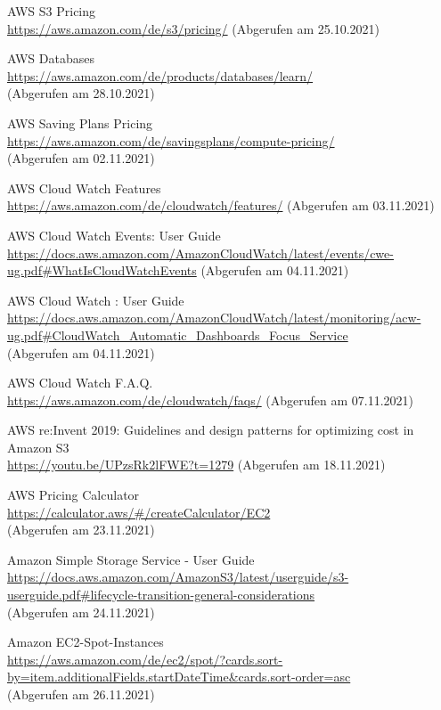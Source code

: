 \begin{thebibliography}{HR08}
   AWS S3 Pricing\\
  \url{https://aws.amazon.com/de/s3/pricing/}
  (Abgerufen am 25.10.2021)

   AWS Databases\\
  \url{https://aws.amazon.com/de/products/databases/learn/}\\
  (Abgerufen am 28.10.2021)

   AWS Saving Plans Pricing\\
  \url{https://aws.amazon.com/de/savingsplans/compute-pricing/}\\
  (Abgerufen am 02.11.2021)

   AWS Cloud Watch Features\\
  \url{https://aws.amazon.com/de/cloudwatch/features/}
  (Abgerufen am 03.11.2021)


   AWS Cloud Watch Events: User Guide\\
  \url{https://docs.aws.amazon.com/AmazonCloudWatch/latest/events/cwe-ug.pdf#WhatIsCloudWatchEvents}
  (Abgerufen am 04.11.2021)

 AWS Cloud Watch : User Guide\\
  \url{https://docs.aws.amazon.com/AmazonCloudWatch/latest/monitoring/acw-ug.pdf#CloudWatch_Automatic_Dashboards_Focus_Service}
  \\(Abgerufen am 04.11.2021)

 AWS Cloud Watch F.A.Q.\\
  \url{https://aws.amazon.com/de/cloudwatch/faqs/}
  (Abgerufen am 07.11.2021)

 AWS re:Invent 2019: Guidelines and design patterns for optimizing cost in Amazon S3\\
  \url{https://youtu.be/UPzsRk2lFWE?t=1279}
  (Abgerufen am 18.11.2021)

 AWS Pricing Calculator\\
  \url{https://calculator.aws/#/createCalculator/EC2}\\
  (Abgerufen am 23.11.2021)
  
 Amazon Simple Storage Service - User Guide\\
  \url{https://docs.aws.amazon.com/AmazonS3/latest/userguide/s3-userguide.pdf#lifecycle-transition-general-considerations}\\
  (Abgerufen am 24.11.2021)

 Amazon EC2-Spot-Instances\\
  \url{https://aws.amazon.com/de/ec2/spot/?cards.sort-by=item.additionalFields.startDateTime&cards.sort-order=asc}\\
  (Abgerufen am 26.11.2021)
  

\end{thebibliography}
